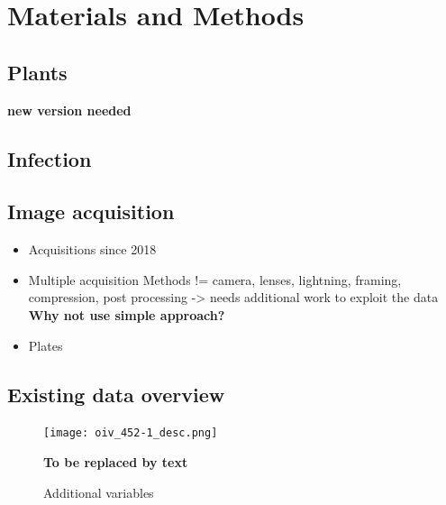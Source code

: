 \documentclass[english]{article}
\begin{document}
\section{Materials and Methods}

\subsection{Plants}

\parencite{bellinResistancePlasmoparaViticola2009} \textbf{new version needed}

\subsection{Infection}

\parencite{bellinResistancePlasmoparaViticola2009}

\subsection{Image acquisition}

\begin{itemize}
	\item Acquisitions since 2018
	\item Multiple acquisition Methods != camera, lenses, lightning, framing, compression, post processing -> needs additional work to exploit the data \textbf{Why not use simple approach?}
	\item Plates
\end{itemize}

\subsection{Existing data overview}

\begin{figure}
	\begin{center}
		\texttt{[image: oiv\_452-1\_desc.png]}
		\caption{Additional variables}\label{fig:newvariables} \textbf{To be replaced by text}
	\end{center}
\end{figure}
\end{document}
